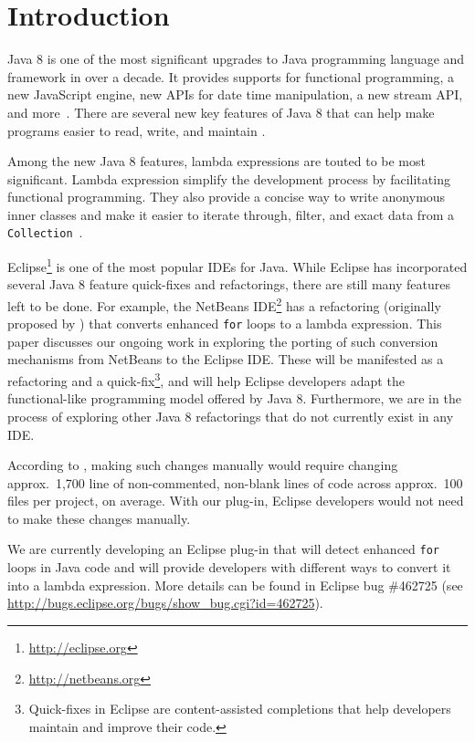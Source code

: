 \section{Introduction}

Java 8 is one of the most significant upgrades to Java programming language
and framework in over a decade. It provides supports for functional
programming, a new JavaScript engine, new APIs for date time manipulation, a
new stream API, and more~\cite{newjdk}. There are several new key features of
Java 8 that can help make programs easier to read, write, and maintain
\cite{gyori2013}.

Among the new Java 8 features, lambda expressions are touted to be most
significant. Lambda expression simplify the development process by
facilitating functional programming. They also provide a concise way to write
anonymous inner classes and make it easier to iterate through, filter, and
exact data from a \lstinline{Collection}~\cite{lambdaqs}.

Eclipse\footnote{\url{http://eclipse.org}} is one of the most popular IDEs for
Java. While Eclipse has incorporated several Java 8 feature quick-fixes and
refactorings, there are still many features left to be done. For example, the
NetBeans IDE\footnote{\url{http://netbeans.org}} has a refactoring (originally
proposed by \citet{gyori2013}) that converts enhanced \lstinline{for} loops to
a lambda expression.  This paper discusses our ongoing work in exploring the
porting of such conversion mechanisms from NetBeans to the Eclipse IDE\@.
These will be manifested as a refactoring and a quick-fix\footnote{Quick-fixes
in Eclipse are content-assisted completions that help developers maintain and
improve their code.}, and will help Eclipse developers adapt the
functional-like programming model offered by Java 8. Furthermore, we are in
the process of exploring other Java 8 refactorings that do not currently exist
in any IDE\@.

According to \citet{gyori2013}, making such changes manually would require
changing approx.~1,700 line of non-commented, non-blank lines of code across
approx.~100 files per project, on average. With our plug-in, Eclipse
developers would not need to make these changes manually. 

We are currently developing an Eclipse plug-in that will detect enhanced
\lstinline{for} loops in Java code and will provide developers with different
ways to convert it into a lambda expression.  More details can be found in
Eclipse bug \#462725 (see
\url{http://bugs.eclipse.org/bugs/show_bug.cgi?id=462725}).
